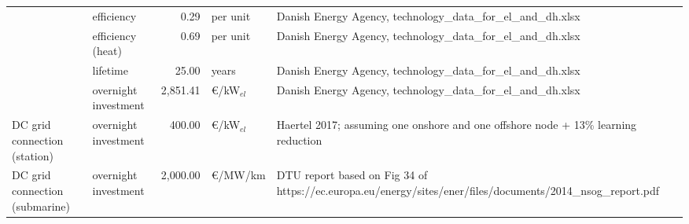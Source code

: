 \begin{longtable}{p{4cm}p{4cm}rp{3cm}p{10cm}}
                      & efficiency &         0.29 &                      per unit &                                                                                                                                                                                                                                                                        Danish Energy Agency, technology\_data\_for\_el\_and\_dh.xlsx \\
                      & efficiency (heat) &         0.69 &                      per unit &                                                                                                                                                                                                                                                                        Danish Energy Agency, technology\_data\_for\_el\_and\_dh.xlsx \\
                      & lifetime &        25.00 &                         years &                                                                                                                                                                                                                                                                        Danish Energy Agency, technology\_data\_for\_el\_and\_dh.xlsx \\
                      & overnight investment &     2,851.41 &               \euro/kW$_{el}$ &                                                                                                                                                                                                                                                                        Danish Energy Agency, technology\_data\_for\_el\_and\_dh.xlsx \\
DC grid connection (station) & overnight investment &       400.00 &               \euro/kW$_{el}$ &                                                                                                                                                                                                                                                   Haertel 2017; assuming one onshore and one offshore node + 13\% learning reduction \\
DC grid connection (submarine) & overnight investment &     2,000.00 &                   \euro/MW/km &                                                                                                                                                                                                                          DTU report based on Fig 34 of https://ec.europa.eu/energy/sites/ener/files/documents/2014\_nsog\_report.pdf \\

\end{longtable}
